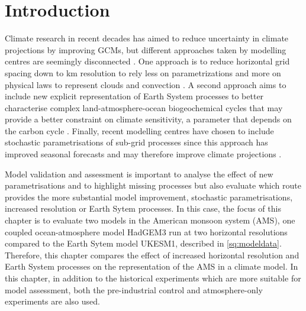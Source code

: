 
\section{Introduction}

Climate research in recent decades has aimed to reduce uncertainty in climate projections by improving GCMs, but different approaches taken by modelling centres are seemingly disconnected \citep{jakob2014}. One approach is to reduce horizontal grid spacing down to km resolution to rely less on parametrizations and more on physical laws to represent clouds and convection \citep{palmer2019}. A second approach aims to include new explicit representation of Earth System processes to better characterise complex land-atmosphere-ocean biogeochemical cycles that may provide a better constraint on climate sensitivity, a parameter that depends on the carbon cycle \citep{marotzke2017,sellar2019,andrews2019}. Finally, recent modelling centres have chosen to include  stochastic  parametrisations of sub-grid processes since this approach has improved seasonal forecasts and may therefore improve climate projections \citep{palmer2019st}. 

Model validation and assessment is important to analyse the effect of new parametrisations and to highlight missing processes but also evaluate which route provides the more substantial model improvement, stochastic parametrisations, increased resolution or Earth Sytem processes. In this case, the focus of this chapter is to evaluate two models in the American monsoon system (AMS), one coupled ocean-atmosphere model HadGEM3 run at two horizontal resolutions compared to the Earth Sytem model UKESM1, described in \ref{sq:modeldata}. Therefore, this chapter compares the effect of increased horizontal resolution and Earth System processes  on the representation of the AMS in a climate model. In this chapter, in addition to the historical experiments which are more suitable for model assessment, both the pre-industrial control and atmosphere-only experiments are also used. 

